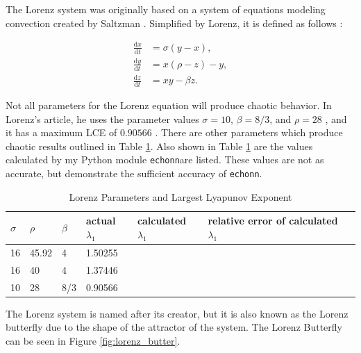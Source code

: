 \documentclass{article}
\newcommand{\echonn}{\texttt{echonn}}
\newcommand{\der}[2][t]{\frac{\mathrm{d}#2}{\mathrm{d}#1}}
\begin{document}
The Lorenz system was originally based on a system of equations modeling
convection created by Saltzman \cite{lorenz1963deterministic}
\cite{saltzman1962finite}. Simplified by Lorenz, it is defined as follows
\cite{lorenz1963deterministic}:

\begin{align}
    \der{x} &= \sigma (y - x), \nonumber \\
    \der{y} &= x (\rho - z) - y, \nonumber \\
    \der{z} &= x y - \beta z. \label{eq:lorenz_equation}
\end{align}

Not all parameters for the Lorenz equation will produce chaotic behavior. In
Lorenz's article, he uses the parameter values $\sigma=10$, $\beta=8/3$, and
$\rho=28$ \cite{lorenz1963deterministic}, and it has a maximum LCE of
$0.90566$ \cite{viswanath1998lyapunov}. There are other parameters which
produce chaotic results outlined in Table \ref{table:lorenz_params}. Also
shown in Table \ref{table:lorenz_params} are the values calculated by my
Python module \echonn are listed. These values are not as accurate,
but demonstrate the sufficient accuracy of \echonn.

\begin{table}[H]
    \centering
    \begin{tabular}{|l|l|l|l|l|l|l|}
        \hline
        $\sigma$ & $\rho$ & $\beta$ & actual $\lambda_1$ & calculated $\lambda_1$ & relative error of calculated $\lambda_1$ \\
        \hline \hline
        16 & 45.92 & 4 & 1.50255 & & \\ %
        16 & 40 & 4 & 1.37446 & & \\
        10 & 28 & 8/3 & 0.90566 & & \\
        \hline
    \end{tabular}
    \caption{
        Lorenz Parameters and Largest Lyapunov Exponent
        \cite{viswanath1998lyapunov}
    }
    \label{table:lorenz_params}
\end{table}

The Lorenz system is named after its creator, but it is also known as the
Lorenz butterfly due to the shape of the attractor of the system. The Lorenz
Butterfly can be seen in Figure \ref{fig:lorenz_butter}.
\end{document}
